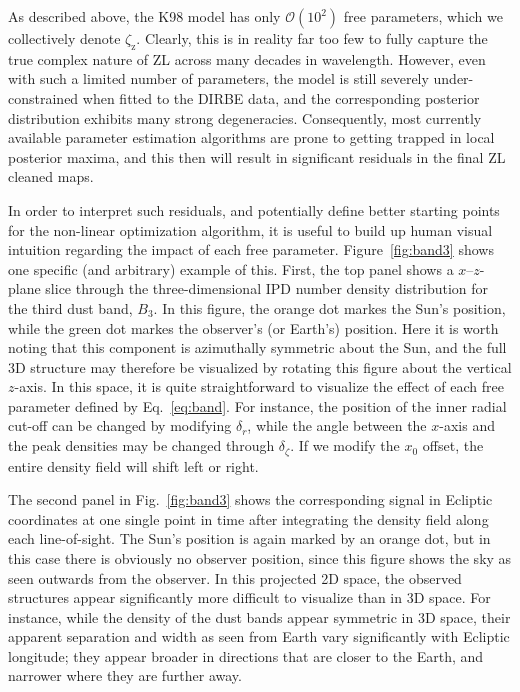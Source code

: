 \documentclass[twocolumn]{aa}
\begin{document}
As described above, the K98 model has only $\mathcal{O}(10^2)$ free
parameters, which we collectively denote
$\zeta_{\mathrm{z}}$. Clearly, this is in reality far too few to fully
capture the true complex nature of ZL across many decades in
wavelength. However, even with such a limited number of parameters,
the model is still severely under-constrained when fitted to the DIRBE
data, and the corresponding posterior distribution exhibits many
strong degeneracies. Consequently, most currently available parameter
estimation algorithms are prone to getting trapped in local posterior
maxima, and this then will result in significant residuals in the
final ZL cleaned maps.

In order to interpret such residuals, and potentially define better
starting points for the non-linear optimization algorithm, it is
useful to build up human visual intuition regarding the impact of each
free parameter. Figure~\ref{fig:band3} shows one specific (and
arbitrary) example of this. First, the top panel shows a
$x$--$z$-plane slice through the three-dimensional IPD number density
distribution for the third dust band, $B_3$. In this figure, the
orange dot markes the Sun's position, while the green dot markes the
observer's (or Earth's) position. Here it is worth noting that this
component is azimuthally symmetric about the Sun, and the full 3D
structure may therefore be visualized by rotating this figure about
the vertical $z$-axis. In this space, it is quite straightforward to
visualize the effect of each free parameter defined by
Eq.~\eqref{eq:band}. For instance, the position of the inner radial
cut-off can be changed by modifying $\delta_{r}$, while the angle
between the $x$-axis and the peak densities may be changed through
$\delta_{\zeta}$. If we modify the $x_0$ offset, the entire density
field will shift left or right.

The second panel in Fig.~\ref{fig:band3} shows the corresponding
signal in Ecliptic coordinates at one single point in time after
integrating the density field along each line-of-sight. The Sun's
position is again marked by an orange dot, but in this case there is
obviously no observer position, since this figure shows the sky as
seen outwards from the observer. In this projected 2D space, the
observed structures appear significantly more difficult to visualize
than in 3D space. For instance, while the density of the dust bands
appear symmetric in 3D space, their apparent separation and width as
seen from Earth vary significantly with Ecliptic longitude; they
appear broader in directions that are closer to the Earth, and
narrower where they are further away.
\end{document}

